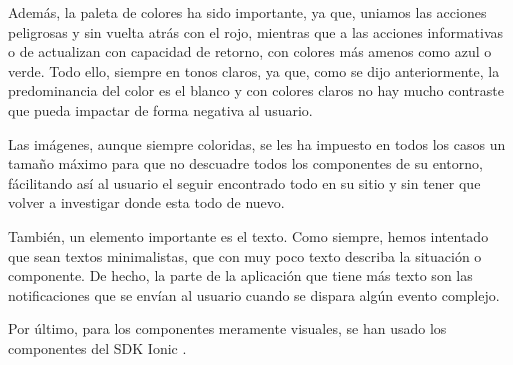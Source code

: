 Además, la paleta de colores ha sido importante, ya que, uniamos las acciones peligrosas y sin vuelta atrás con el rojo, mientras que a las acciones informativas o de actualizan con capacidad de retorno, con colores más amenos como azul o verde. Todo ello, siempre en tonos claros, ya que, como se dijo anteriormente, la predominancia del color es el blanco y con colores claros no hay mucho contraste que pueda impactar de forma negativa al usuario.

Las imágenes, aunque siempre coloridas, se les ha impuesto en todos los casos un tamaño máximo para que no descuadre todos los componentes de su entorno, fácilitando así al usuario el seguir encontrado todo en su sitio y sin tener que volver a investigar donde esta todo de nuevo.

También, un elemento importante es el texto. Como siempre, hemos intentado que sean textos minimalistas, que con muy poco texto describa la situación o componente. De hecho, la parte de la aplicación que tiene más texto son las notificaciones que se envían al usuario cuando se dispara algún evento complejo.

Por último, para los componentes meramente visuales, se han usado los componentes del SDK Ionic \cite{ui-ionic}.